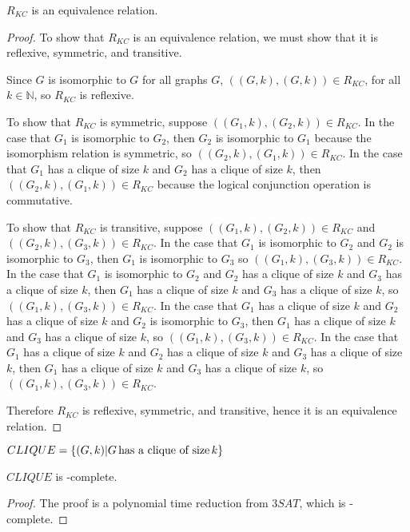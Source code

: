 \begin{theorem}$R_{KC}$ is an equivalence relation.\end{theorem}
\begin{proof}To show that $R_{KC}$ is an equivalence relation, we must show
  that it is reflexive, symmetric, and transitive.

  Since $G$ is isomorphic to $G$ for all graphs $G$, $((G,k),(G,k))\in R_{KC}$,
  for all $k\in\mathbb{N}$, so $R_{KC}$ is reflexive.

  To show that $R_{KC}$ is symmetric, suppose $((G_1, k), (G_2, k))\in
  R_{KC}$. In the case that $G_1$ is isomorphic to $G_2$, then $G_2$ is
  isomorphic to $G_1$ because the isomorphism relation is symmetric, so
  $((G_2,k),(G_1,k))\in R_{KC}$. In the case that $G_1$ has a clique of size
  $k$ and $G_2$ has a clique of size $k$, then $((G_2,k),(G_1,k))\in R_{KC}$
  because the logical conjunction operation is commutative.

  To show that $R_{KC}$ is transitive, suppose $((G_1, k), (G_2, k))\in R_{KC}$
  and $((G_2, k), (G_3, k))\in R_{KC}$. In the case that $G_1$ is isomorphic to
  $G_2$ and $G_2$ is isomorphic to $G_3$, then $G_1$ is isomorphic to $G_3$ so
  $((G_1, k), (G_3, k))\in R_{KC}$. In the case that $G_1$ is isomorphic to
  $G_2$ and $G_2$ has a clique of size $k$ and $G_3$ has a clique of size $k$,
  then $G_1$ has a clique of size $k$ and $G_3$ has a clique of size $k$, so
  $((G_1, k), (G_3, k))\in R_{KC}$. In the case that $G_1$ has a clique of size
  $k$ and $G_2$ has a clique of size $k$ and $G_2$ is isomorphic to $G_3$, then
  $G_1$ has a clique of size $k$ and $G_3$ has a clique of size $k$, so $((G_1,
  k), (G_3, k))\in R_{KC}$. In the case that $G_1$ has a clique of size $k$ and
  $G_2$ has a clique of size $k$ and $G_3$ has a clique of size $k$, then $G_1$
  has a clique of size $k$ and $G_3$ has a clique of size $k$, so $((G_1, k),
  (G_3, k))\in R_{KC}$.

  Therefore $R_{KC}$ is reflexive, symmetric, and transitive, hence it is an
  equivalence relation.
\end{proof}

\begin{definition}$CLIQUE=\{(G,k)|G \,\text{has a clique of size}\,
  k\}$\end{definition}

\begin{lemma}$CLIQUE$ is \NP-complete.\end{lemma}
\begin{proof}The proof is a polynomial time reduction from $3SAT$, which is
  \NP-complete.\end{proof}

